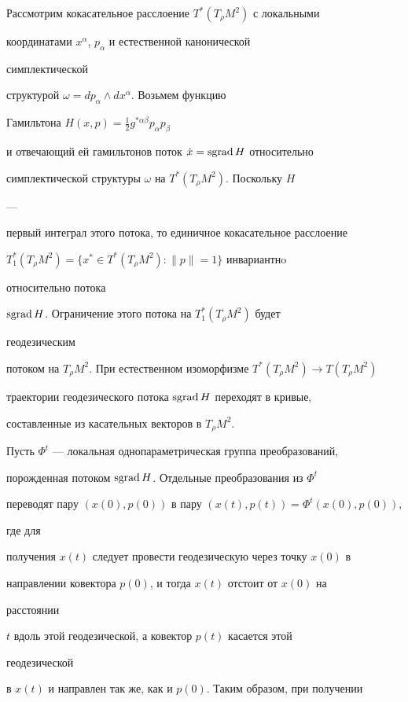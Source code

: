  


Рассмотрим кокасательное расслоение $T^*(T_\rho M^2)$ с локальными 


координатами $x^\alpha$, $p_\alpha$ и естественной канонической 


симплектической 


структурой $\omega=d p_\alpha\wedge d x^\alpha$. Возьмем функцию 


Гамильтона $H(x,p)=\frac{1}{2}g^{*\alpha\beta}p_\alpha p_\beta$ 


и отвечающий ей гамильтонов поток $\Dot x=\operatorname{sgrad} H$ относительно 


симплектической структуры $\omega$ на $T^*(T_\rho M^2)$. Поскольку $H$ 


--- 


первый интеграл этого потока, то единичное кокасательное расслоение


$T^*_1(T_\rho M^2)=\{x^*\in T^*(T_\rho M^2):\|p\|=1\}$ инвариантнo 


относительно потока 


$\operatorname{sgrad} H$. Ограничение этого потока на $T^*_1(T_\rho M^2)$ будет 


геодезическим 


потоком на $T_\rho M^2$. При естественном изоморфизме $T^*(T_\rho 


M^2)\to T(T_\rho M^2)$ 


траектории геодезического потока $\operatorname{sgrad} H$ переходят в кривые, 


составленные из касательных векторов в $T_\rho M^2$. 


 


Пусть $\Phi^t$ --- локальная однопараметрическая группа преобразований, 


порожденная потоком $\operatorname{sgrad} H$. Отдельные преобразования из $\Phi^t$ 


переводят пару $(x(0),p(0))$ в пару $(x(t),p(t))=\Phi^t(x(0),p(0))$, 


где для 


получения $x(t)$ следует провести геодезическую через точку $x(0)$ в 


направлении ковектора $p(0)$, и тогда $x(t)$ отстоит от $x(0)$ на 


расстоянии 


$t$ вдоль этой геодезической, а ковектор $p(t)$ касается этой 


геодезической 


в $x(t)$ и направлен так же, как и $p(0)$. Таким образом, при получении 


